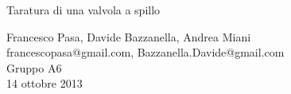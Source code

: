 \begin{center}

	\vspace{0.5cm}
     	{\huge Taratura di una valvola a spillo}
	\vspace{0.5cm}

      	{\large Francesco Pasa, Davide Bazzanella, Andrea Miani} \\
      	{francescopasa@gmail.com, Bazzanella.Davide@gmail.com} \\
		{\large Gruppo A6} \\
	
	\vspace{0.3cm}
      	{\large 14 ottobre 2013}
    
    \vspace{0.7cm}

\end{center}
